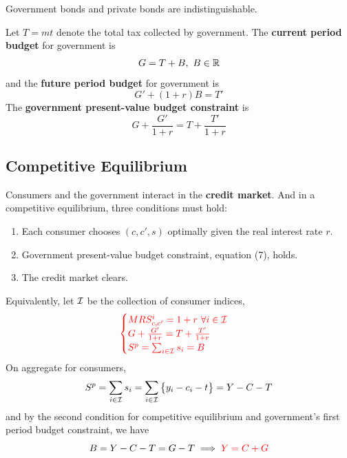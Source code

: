 \documentclass[11pt]{article}
\begin{document}
		\begin{assumption}
			Government bonds and private bonds are indistinguishable.
		\end{assumption}
		
		\par Let $T = mt$ denote the total tax collected by government. The \textbf{current period budget} for government is
		\begin{equation}
			G = T + B, \ B \in \mathbb{R}
		\end{equation}
		and the \textbf{future period budget} for government is
		\begin{equation}
			G' + (1+r)B = T'
		\end{equation}
		The \textbf{government present-value budget constraint} is
		\begin{equation}
		G + \frac{G'}{1 + r} = T + \frac{T'}{1 + r}
		\end{equation}
		
		\subsection{Competitive Equilibrium}
		\par Consumers and the government interact in the \textbf{credit market}. And in a competitive equilibrium, three conditions must hold:
		\begin{enumerate}
			\item Each consumer chooses $(c, c', s)$ optimally given the real interest rate $r$.
			\item Government present-value budget constraint, equation (7), holds.
			\item The credit market clears.
		\end{enumerate}
		Equivalently, let $\mathcal{{I}}$ be the collection of consumer indices,
		\[
		\begin{color}{red}
			\begin{cases}
				MRS_{c, c'}^{i} = 1+r\ \forall i \in \mc{I}\\
				G + \frac{G'}{1+r} = T + \frac{T'}{1+r} \\
				S^p = \sum_{i\in\mc{I}}{s_i} = B \\
			\end{cases}
		\end{color}
		\]
		On aggregate for consumers, 
		\begin{equation}
			S^p =  \sum_{i \in \mathcal{{I}}}{s_i} = \sum_{i \in \mathcal{{I}}}\big \{y_i - c_i - t \big \} = Y - C - T
		\end{equation}
		and by the second condition for competitive equilibrium and government's first period budget constraint, we have 
		\begin{equation}
			B = Y - C - T = G - T \implies \begin{color}{red} Y = C + G \end{color}
		\end{equation}
		
\end{document}
